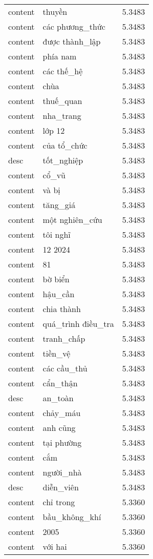 \documentclass{article}
\begin{document}
\begin{tabular}{lll}
content & thuyền & 5.3483\\
content & các phương\_thức & 5.3483\\
content & được thành\_lập & 5.3483\\
content & phía nam & 5.3483\\
content & các thế\_hệ & 5.3483\\
content & chùa & 5.3483\\
content & thuế\_quan & 5.3483\\
content & nha\_trang & 5.3483\\
content & lớp 12 & 5.3483\\
content & của tổ\_chức & 5.3483\\
desc & tốt\_nghiệp & 5.3483\\
content & cổ\_vũ & 5.3483\\
content & và bị & 5.3483\\
content & tăng\_giá & 5.3483\\
content & một nghiên\_cứu & 5.3483\\
content & tôi nghĩ & 5.3483\\
content & 12 2024 & 5.3483\\
content & 81 & 5.3483\\
content & bờ biển & 5.3483\\
content & hậu\_cần & 5.3483\\
content & chia thành & 5.3483\\
content & quá\_trình điều\_tra & 5.3483\\
content & tranh\_chấp & 5.3483\\
content & tiền\_vệ & 5.3483\\
content & các cầu\_thủ & 5.3483\\
content & cẩn\_thận & 5.3483\\
desc & an\_toàn & 5.3483\\
content & chảy\_máu & 5.3483\\
content & anh cũng & 5.3483\\
content & tại phường & 5.3483\\
content & cắm & 5.3483\\
content & người\_nhà & 5.3483\\
desc & diễn\_viên & 5.3483\\
content & chỉ trong & 5.3360\\
content & bầu\_không\_khí & 5.3360\\
content & 2005 & 5.3360\\
content & với hai & 5.3360\\

\end{tabular}
\end{document}
